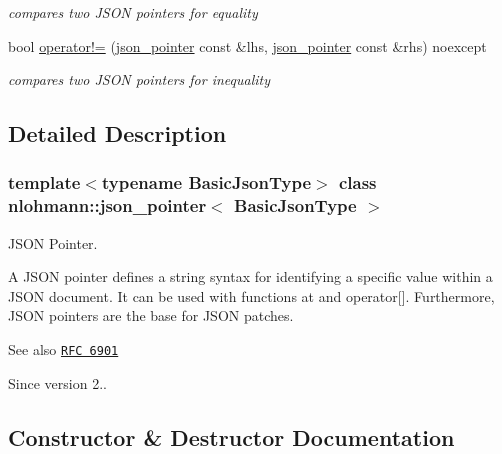 \begin{DoxyCompactItemize}
\begin{DoxyCompactList}\small\item\em compares two J\+S\+ON pointers for equality \end{DoxyCompactList}\item 
bool \mbox{\hyperlink{classnlohmann_1_1json__pointer_a6779edcf28e6f018a3bbb29c0b4b5e1e}{operator!=}} (\mbox{\hyperlink{classnlohmann_1_1json__pointer}{json\+\_\+pointer}} const \&lhs, \mbox{\hyperlink{classnlohmann_1_1json__pointer}{json\+\_\+pointer}} const \&rhs) noexcept
\begin{DoxyCompactList}\small\item\em compares two J\+S\+ON pointers for inequality \end{DoxyCompactList}\end{DoxyCompactItemize}


\subsection{Detailed Description}
\subsubsection*{template$<$typename Basic\+Json\+Type$>$\newline
class nlohmann\+::json\+\_\+pointer$<$ Basic\+Json\+Type $>$}

J\+S\+ON Pointer. 

A J\+S\+ON pointer defines a string syntax for identifying a specific value within a J\+S\+ON document. It can be used with functions {\ttfamily at} and {\ttfamily operator\mbox{[}\mbox{]}}. Furthermore, J\+S\+ON pointers are the base for J\+S\+ON patches.

\begin{DoxySeeAlso}{See also}
\href{https://tools.ietf.org/html/rfc6901}{\tt R\+FC 6901}
\end{DoxySeeAlso}
\begin{DoxySince}{Since}
version 2.. 
\end{DoxySince}


\subsection{Constructor \& Destructor Documentation}
\mbox{\label{classnlohmann_1_1json__pointer_a7f32d7c62841f0c4a6784cf741a6e4f8}} 
